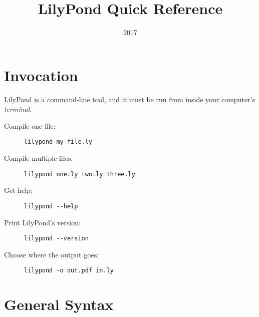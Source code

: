 \documentclass[a4paper]{tufte-handout}
\title{LilyPond Quick Reference}
\date{2017}
\begin{document}
\maketitle

\section{Invocation}

LilyPond is a command-line tool, and it must be run from inside your computer's
\emph{terminal}.

\begin{description}
    \item [Compile one file:]
        \hfill \verb|lilypond my-file.ly|
    \item [Compile multiple files:]
        \hfill \verb|lilypond one.ly two.ly three.ly|
    \item [Get help:]
        \hfill \verb|lilypond --help|
    \item [Print LilyPond's version:]
        \hfill \verb|lilypond --version|
    \item [Choose where the output goes:]
        \hfill \verb|lilypond -o out.pdf in.ly|
\end{description}

\hrulefill{}

\section{General Syntax}
\end{document}
